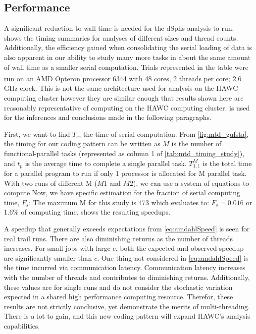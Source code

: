 \subsection{Performance}\label{sec:mtd_performance}



A significant reduction to wall time is needed for the dSphs analysis to run.
 shows the timing summaries for analyses of different sizes and thread counts.
Additionally, the efficiency gained when consolidating the serial loading of data is also apparent in our ability to study many more tasks in about the same amount of wall time as a smaller serial computation.
Trials represented in the table were run on an AMD Opteron\textsuperscript{\textregistered} processor 6344 with 48 cores, 2 threads per core; 2.6 GHz clock.
This is not the same architecture used for analysis on the HAWC computing cluster however they are similar enough that results shown here are reasonably representative of computing on the HAWC computing cluster.
 is used for the inferences and conclusions made in the following paragraphs.

First, we want to find $T_s$, the time of serial computation.
From \cref{fig:mtd_gufsta}, the timing for our coding pattern can be written as
\TimingAll
$M$ is the number of functional-parallel tasks (represented as column 1 of \cref{tab:mtd_timing_study}), and $t_p$ is the average time to complete a single parallel task.
$T^M_{1,1}$ is the total time for a parallel program to run if only 1 processor is allocated for M parallel task.
With two runs of different M ($M1$ and $M2$), we can use a system of equations to compute
Now, we have specific estimation for the fraction of serial computing time, $F_s$:
The maximum M for this study is 473 which evaluates to: $F_s = 0.016$ or 1.6\% of computing time.
 shows the resulting speedups.


A speedup that generally exceeds expectations from \cref{eq:amdahlSpeed} is seen for real trail runs.
There are also diminishing returns as the number of threads increases.
For small jobs with large $c$, both the expected and observed speedup are significantly smaller than $c$.
One thing not considered in \cref{eq:amdahlSpeed} is the time incurred via communication latency.
Communication latency increases with the number of threads and contributes to diminishing returns.
Additionally, these values are for single runs and do not consider the stochastic variation expected in a shared high performance computing resource.
Therefor, these results are not strictly conclusive, yet demonstrate the merits of multi-threading.
There is a lot to gain, and this new coding pattern will expand HAWC's analysis capabilities.


